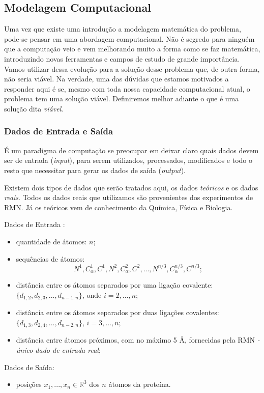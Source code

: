 \documentclass[a4paper,12pt]{article}
\begin{document}
	
	\subsection{Modelagem Computacional \label{sec:modelagem}}
	
	Uma vez que existe uma introdução a modelagem matemática do problema, pode-se pensar em uma abordagem computacional. Não é segredo para ninguém que a computação veio e vem melhorando muito a forma como se faz matemática, introduzindo novas ferramentas e campos de estudo de grande importância. Vamos utilizar dessa evolução para a solução desse problema que, de outra forma, não seria viável. Na verdade, uma das dúvidas que estamos motivados a responder aqui é se, mesmo com toda nossa capacidade computacional atual, o problema tem uma solução viável. Definiremos melhor adiante o que é uma solução dita \textit{viável}. 
	
	\subsubsection*{Dados de Entrada e Saída}
	É um paradigma de computação se preocupar em deixar claro quais dados devem ser de entrada (\textit{input}), para serem utilizados, processados, modificados e todo o resto que necessitar para gerar os dados de saída (\textit{output}).
	
	Existem dois tipos de dados que serão tratados aqui, os dados \textit{teóricos} e os dados \textit{reais}. Todos os dados reais que utilizamos são provenientes dos experimentos de RMN. Já os teóricos vem de conhecimento da Química, Física e Biologia.
	
	\begin{description}
		\item{Dados de Entrada \cite{carlileBook31Coloquio}}:
		\begin{itemize}
			\item quantidade de átomos: $n$;
			\item sequências de átomos:
			$$N^1,C^{1}_{\alpha},C^1,N^2,C^{2}_{\alpha},C^2, ...,N^{n/3},C^{n/3}_{\alpha},C^{n/3};
			$$
			\item distância entre os átomos separados por uma ligação covalente: $\{d_{1,2},d_{2,3}, ...,d_{n-1,n}\}$, onde $i = 2, ..., n;$
			\item distância entre os átomos separados por duas ligações covalentes: $\{d_{1,3},d_{2,4}, ...,d_{n-2,n}\}$, $i=3, ..., n;$
			\item distância entre átomos próximos, com no máximo 5 \AA, fornecidas pela RMN \textit{- único dado de entrada real};
		\end{itemize}
		\item{Dados de Saída:}
		\begin{itemize}
			\item posições $x_1, ...,x_n \in\mathbb{R}^3$ dos $n$ átomos da proteína.
		\end{itemize}
	\end{description}
	
\end{document}

